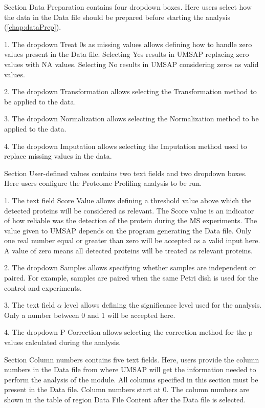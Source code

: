 Section Data Preparation contains four dropdown boxes. Here users select how the data
in the Data file should be prepared before starting the analysis (\autoref{chap:dataPrep}).

\num{1}. The dropdown Treat \num{0}s as missing values allows defining how
to handle zero values present in the Data file. Selecting Yes results in UMSAP
replacing zero values with NA values. Selecting No results in UMSAP considering
zeros as valid values.

\num{2}. The dropdown Transformation allows selecting the Transformation method
to be applied to the data.

\num{3}. The dropdown Normalization allows selecting the Normalization method
to be applied to the data.

\num{4}. The dropdown Imputation allows selecting the Imputation method used
to replace missing values in the data.

Section User-defined values contains two text fields and two dropdown boxes. Here
users configure the Proteome Profiling analysis to be run.

\num{1}. The text field Score Value\label{par:protprofScoreValue} allows
defining a threshold value above which the detected proteins will be considered as
relevant. The Score value is an indicator of how reliable was the detection of
the protein during the MS experiments. The value given to UMSAP depends on the program
generating the Data file. Only one real number equal or greater than zero will be
accepted as a valid input here. A value of zero means all detected proteins will be
treated as relevant proteins.

\num{2}. The dropdown Samples allows specifying whether samples are independent
or paired. For example, samples are paired when the same Petri dish is used for the
control and experiments.

\num{3}. The text field $\alpha$ level allows defining the significance level
used for the analysis. Only a number between \num{0} and \num{1} will be accepted
here.

\num{4}. The dropdown P Correction allows selecting the correction method for
the p values calculated during the analysis.

Section Column numbers contains five text fields. Here, users provide the column
numbers in the Data file from where UMSAP will get the information needed to perform
the analysis of the module. All columns specified in this section must be present
in the Data file. Column numbers start at \num{0}. The column numbers are shown in
the table of region Data File Content after the Data file is selected.

